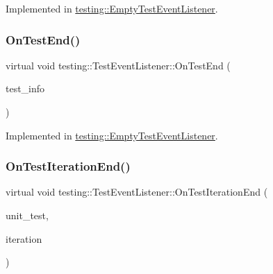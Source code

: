 Implemented in \mbox{\hyperlink{classtesting_1_1_empty_test_event_listener_ae4707ed9cc7ace5241bc8ccc4051209b}{testing\+::\+Empty\+Test\+Event\+Listener}}.

\mbox{\label{classtesting_1_1_test_event_listener_abb1c44525ef038500608b5dc2f17099b}} 
\subsubsection{\texorpdfstring{OnTestEnd()}{OnTestEnd()}}
{\footnotesize\ttfamily virtual void testing\+::\+Test\+Event\+Listener\+::\+On\+Test\+End (\begin{DoxyParamCaption}\item[{const \mbox{\hyperlink{classtesting_1_1_test_info}{Test\+Info}} \&}]{test\+\_\+info }\end{DoxyParamCaption})\hspace{0.3cm}{\ttfamily [pure virtual]}}



Implemented in \mbox{\hyperlink{classtesting_1_1_empty_test_event_listener_afd58d21005f0d0d0399fb114627545d3}{testing\+::\+Empty\+Test\+Event\+Listener}}.

\mbox{\label{classtesting_1_1_test_event_listener_a550fdb3e55726e4cefa09f5697941425}} 
\subsubsection{\texorpdfstring{OnTestIterationEnd()}{OnTestIterationEnd()}}
{\footnotesize\ttfamily virtual void testing\+::\+Test\+Event\+Listener\+::\+On\+Test\+Iteration\+End (\begin{DoxyParamCaption}\item[{const \mbox{\hyperlink{classtesting_1_1_unit_test}{Unit\+Test}} \&}]{unit\+\_\+test,  }\item[{int}]{iteration }\end{DoxyParamCaption})\hspace{0.3cm}{\ttfamily [pure virtual]}}



